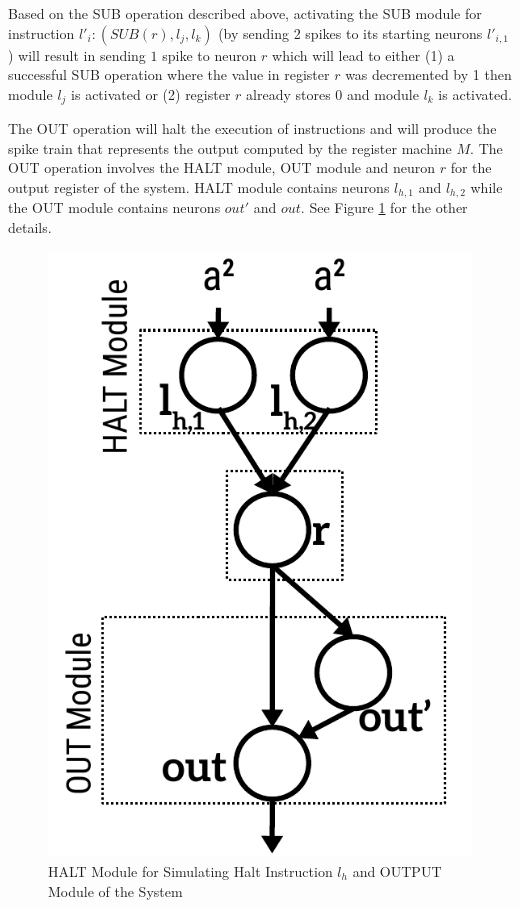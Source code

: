 \documentclass[smallextended]{svjour3}
\begin{document}

Based on the SUB operation described above, activating the SUB module for instruction $l'_i:(SUB(r),l_j,l_k)$ (by sending 2 spikes to its starting 
neurons  $l'_{i,1}$) will result in sending $1$ spike to neuron $r$ which will lead to either (1) a successful SUB operation where the value in 
register $r$ was decremented by 1 then module $l_j$ is activated or (2) register $r$ already stores 0 and module $l_k$ is activated.


The OUT operation will halt the execution of instructions and will produce the spike train that represents the output computed by the register 
machine $M$. The OUT operation involves the HALT module, OUT module and neuron $r$ for the output register of the system. HALT module contains 
neurons $l_{h,1}$ and $l_{h,2}$ while the OUT module contains neurons $out'$ and $out$. See Figure \ref{fig-halt} for the other details.

   
\begin{figure}
\begin{center}
\includegraphics[scale=0.50]{Fig3.pdf}
\caption{HALT Module for Simulating Halt Instruction $l_h$ and OUTPUT Module of the System}
\label{fig-halt}
\end{center}
\end{figure}   
\end{document}
